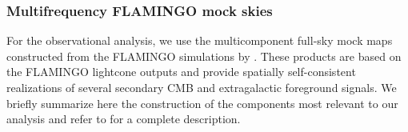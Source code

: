 \documentclass[aps,prd,twocolumn,superscriptaddress,nofootinbib,floatfix]{revtex4-2}
\begin{document}


\subsubsection{Multifrequency FLAMINGO mock skies}
For the observational analysis, we use the multicomponent full-sky mock maps constructed from the FLAMINGO simulations by \citet{Yang:2025per}. These products are based on the FLAMINGO lightcone outputs and provide spatially self-consistent realizations of several secondary CMB and extragalactic foreground signals. We briefly summarize here the construction of the components most relevant to our analysis and refer to \citet{Yang:2025per} for a complete description.
\end{document}
